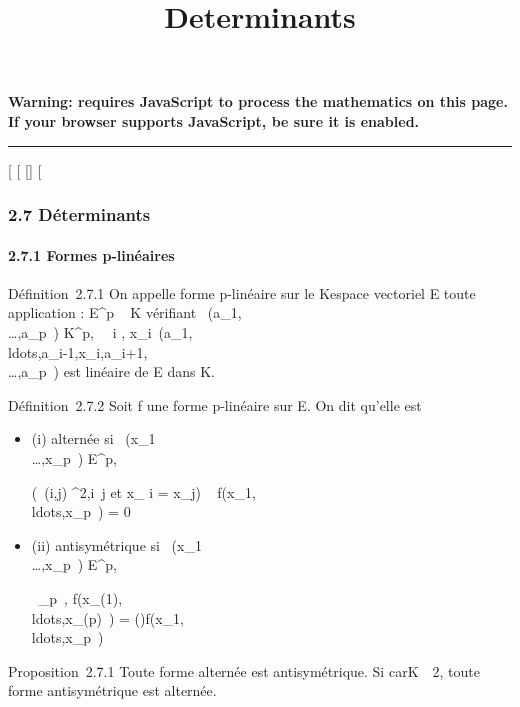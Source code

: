 \documentclass[]{article}
\title{Determinants}
\author{}
\date{}
\begin{document}
\maketitle

\textbf{Warning: 
requires JavaScript to process the mathematics on this page.\\ If your
browser supports JavaScript, be sure it is enabled.}

\begin{center}\rule{3in}{0.4pt}\end{center}

[
[
[]
[

\subsubsection{2.7 Déterminants}

\paragraph{2.7.1 Formes p-linéaires}

Définition~2.7.1 On appelle forme p-linéaire sur le Kespace vectoriel E
toute application \phi : E^p \rightarrow~ K vérifiant
\forall~(a_1,\\\ldots,a_p~)
\in K^p, \forall~~i \in [1,p],
x_i\mapsto~\phi(a_1,\\ldots,a_i-1,x_i,a_i+1,\\\ldots,a_p~)
est linéaire de E dans K.

Définition~2.7.2 Soit f une forme p-linéaire sur E. On dit qu'elle est

\begin{itemize}
\item
  (i) alternée si
  \forall~(x_1\\\ldots,x_p~)
  \in E^p,

  \left (\exists~(i,j) \in
  [1,p]^2,i\neq~j\text
  et x_ i = x_j\right ) \rigtharrow~
  f(x_1,\\ldots,x_p~)
  = 0
\item
  (ii) antisymétrique si
  \forall~(x_1\\\ldots,x_p~)
  \in E^p,

  \forall~\sigma \inS_p~,
  f(x_\sigma(1),\\ldots,x_\sigma(p)~)
  =
  \epsilon(\sigma)f(x_1,\\ldots,x_p~)
\end{itemize}

Proposition~2.7.1 Toute forme alternée est antisymétrique. Si
carK\mathrel\neq~~2, toute forme
antisymétrique est alternée.
\end{document}
